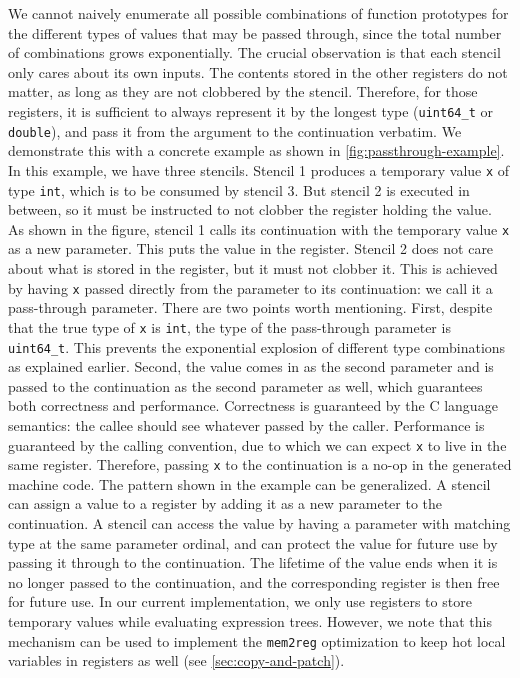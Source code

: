 \documentclass[acmsmall,nonacm,screen]{acmart}\settopmatter{printfolios=true,printccs=true,printacmref=false}
\newcommand{\figref}[1]{\autoref{#1}}
\newcommand{\secref}[1]{\autoref{#1}}
\newcommand\code[1]{\lstinline[mathescape=true,basicstyle=\ttfamily\normalsize]|#1|}
\begin{document}
We cannot naively enumerate all possible combinations of function prototypes for the different types of values that may be passed through, since the total number of combinations grows exponentially. The crucial observation is that each stencil only cares about its own inputs. The contents stored in the other registers do not matter, as long as they are not clobbered by the stencil. Therefore, for those registers, it is sufficient to always represent it by the longest type (\code{uint64_t} or \code{double}), and pass it from the argument to the continuation verbatim. We demonstrate this with a concrete example as shown in \figref{fig:passthrough-example}. In this example, we have three stencils. Stencil 1 produces a temporary value \code{x} of type \code{int}, which is to be consumed by stencil 3. But stencil 2 is executed in between, so it must be instructed to not clobber the register holding the value. As shown in the figure, stencil 1 calls its continuation with the temporary value \code{x} as a new parameter. This puts the value in the register. Stencil 2 does not care about what is stored in the register, but it must not clobber it. This is achieved by having \code{x} passed directly from the parameter to its continuation: we call it a pass-through parameter. There are two points worth mentioning. First, despite that the true type of \code{x} is \code{int}, the type of the pass-through parameter is \code{uint64_t}. This prevents the exponential explosion of different type combinations as explained earlier. Second, the value comes in as the second parameter and is passed to the continuation as the second parameter as well, which guarantees both correctness and performance. Correctness is guaranteed by the C language semantics: the callee should see whatever passed by the caller. Performance is guaranteed by the calling convention, due to which we can expect \code{x} to live in the same register. Therefore, passing \code{x} to the continuation is a no-op in the generated machine code. The pattern shown in the example can be generalized. A stencil can assign a value to a register by adding it as a new parameter to the continuation. A stencil can access the value by having a parameter with matching type at the same parameter ordinal, and can protect the value for future use by passing it through to the continuation. The lifetime of the value ends when it is no longer passed to the continuation, and the corresponding register is then free for future use.  In our current implementation, we only use registers to store temporary values while evaluating expression trees. However, we note that this mechanism can be used to implement the {\tt mem2reg} optimization to keep hot local variables in registers as well (see \secref{sec:copy-and-patch}).
\end{document}

